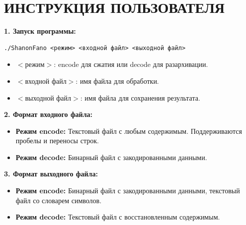 \documentclass[12pt]{article}
\begin{document}
\newpage
\section{\textbf{ИНСТРУКЦИЯ ПОЛЬЗОВАТЕЛЯ}}
\noindent
\textbf{1. Запуск программы:}
\begin{verbatim}
./ShanonFano <режим> <входной файл> <выходной файл>
\end{verbatim}
\begin{itemize}
    \item $<$режим$>$: encode для сжатия или decode для разархивации.
    \item $<$входной файл$>$: имя файла для обработки.
    \item $<$выходной файл$>$: имя файла для сохранения результата.
\end{itemize}

\noindent
\textbf{2. Формат входного файла:}
\begin{itemize}
    \item \textbf{Режим encode:} Текстовый файл с любым содержимым. Поддерживаются пробелы и переносы строк.
    \item \textbf{Режим decode:} Бинарный файл с закодированными данными.
\end{itemize}

\noindent
\textbf{3. Формат выходного файла:}
\begin{itemize}
    \item \textbf{Режим encode:} Бинарный файл с закодированными данными, текстовый файл со словарем символов.
    \item \textbf{Режим decode:} Текстовый файл с восстановленным содержимым.
\end{itemize}

\newpage
\end{document}
